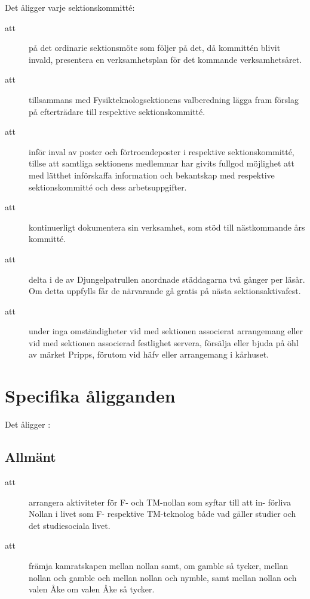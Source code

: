Det åligger varje sektionskommitté:
\begin{description}
    \item[att] på det ordinarie sektionsmöte som följer på det, då kommittén blivit invald, presentera en verksamhetsplan för det kommande verksamhetsåret.
      \item[att] tillsammans med Fysikteknologsektionens valberedning lägga fram förslag på efterträdare till respektive sektionskommitté.
      \item[att] inför inval av poster och förtroendeposter i respektive sektionskommitté, tillse att samtliga sektionens medlemmar har givits fullgod möjlighet att med lätthet införskaffa information och bekantskap med respektive sektionskommitté och dess arbetsuppgifter.
      \item[att] kontinuerligt dokumentera sin verksamhet, som stöd till näst\-komm\-ande års kommitté.
      \item[att] delta i de av Djungelpatrullen anordnade städdagarna två gånger per
      läsår. Om detta uppfylls får de närvarande gå gratis på nästa
      sektionsaktivafest.
      \item[att] under inga omständigheter vid med sektionen associerat arrangemang eller vid med sektionen associerad festlighet servera, försälja eller bjuda på öhl av märket Pripps, förutom vid häfv eller arrangemang i kårhuset.
      
    \end{description}

\section{Specifika åligganden}
Det åligger \forening :

\subsection{Allmänt}
\begin{description}



\item[att] arrangera aktiviteter för F- och TM-nollan som syftar till att in-
förliva Nollan i livet som F- respektive TM-teknolog både vad
gäller studier och det studiesociala livet.

\item[att] främja kamratskapen mellan nollan samt, om gamble så tycker, mellan nollan och gamble och mellan nollan och nymble, samt mellan nollan och valen Åke om valen Åke så tycker.

\end{description}
